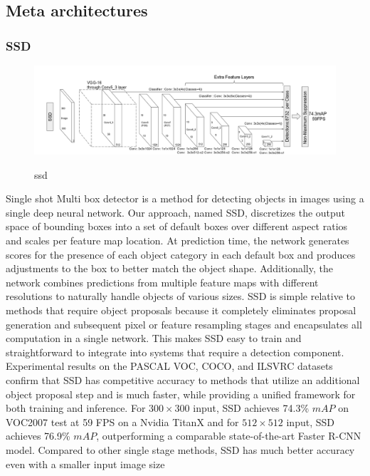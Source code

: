 \documentclass[12pt]{article}
\begin{document}
    \subsection{Meta architectures}
        \subsubsection{SSD}
        \begin{figure}[h]
    	\centering
    	\includegraphics[width=1\textwidth]{ssd.png}
       	\label{fig:mesh16}
	\caption{ssd}
	\end{figure} 
        Single shot Multi box detector is a method for detecting objects in images using a single deep neural network. Our approach, named SSD, discretizes the output space of bounding boxes into a set of default boxes over different aspect ratios and scales per feature map location. At prediction time, the network generates scores for the
presence of each object category in each default box and produces adjustments to
the box to better match the object shape. Additionally, the network combines predictions from multiple feature maps with different resolutions to naturally handle objects of various sizes. SSD is simple relative to methods that require object proposals because it completely eliminates proposal generation and subsequent pixel or feature resampling stages and encapsulates all computation in a single network. This makes SSD easy to train and straightforward to integrate into systems that require a detection component. Experimental results on the PASCAL VOC, COCO, and ILSVRC datasets confirm that SSD has competitive accuracy to methods that utilize an additional object proposal step and is much faster, while
providing a unified framework for both training and inference. For $300\times 300$ input, SSD achieves 74.3\% $mAP$
on VOC2007 test at 59 FPS on a Nvidia TitanX and for
$512\times 512$ input, SSD achieves 76.9\% $mAP$, outperforming a comparable state-of-the-art Faster R-CNN model. Compared to other single stage methods, SSD has much better accuracy even with a smaller input image size
        
\end{document}
